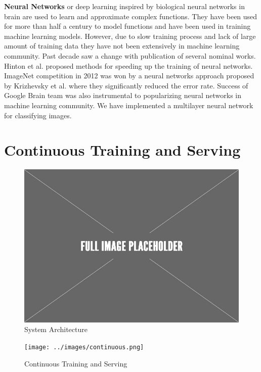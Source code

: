 \documentclass{sig-alternate-05-2015}
\begin{document}
\textbf{Neural Networks} or deep learning inspired by biological neural networks in brain are used to learn and approximate complex functions. 
They have been used for more than half a century to model functions and have been used in training machine learning models.
However, due to slow training process and lack of large amount of training data they have not been extensively in machine learning community.
Past decade saw a change with publication of several nominal works.
Hinton et al. \cite{hinton2006fast} proposed methods for speeding up the training of neural networks.
ImageNet competition \cite{ILSVRC15} in 2012 was won by a neural networks approach proposed by Krizhevsky et al. \cite{krizhevsky2012imagenet} where they significantly reduced the error rate. 
Success of Google Brain team \cite{sutskever2014sequence, mikolov2013efficient} was also instrumental to popularizing neural networks in machine learning community.
We have implemented a multilayer neural network for classifying images.

\section{Continuous Training and Serving} \label{continious-training-serving}

\begin{figure}[h]
\centering
\includegraphics[scale=0.30]{../images/placeholder.jpeg}
\caption{System Architecture}
\label{fig:system-architecture}
\end{figure}

\begin{figure}[h]
\centering
\texttt{[image: ../images/continuous.png]}
\caption{Continuous Training and Serving}
\label{fig:cont-training-serving}
\end{figure}
\end{document}
